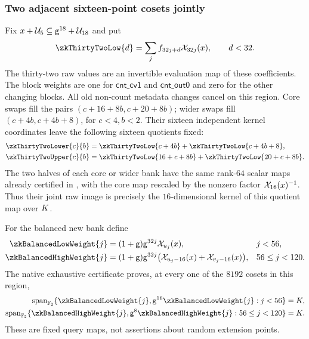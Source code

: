 \subsubsection{Two adjacent sixteen-point cosets jointly}

Fix $x+\mathcal{U}_5\subseteq\mathsf{g}^{18}+\mathcal{U}_{18}$ and put
\[
 \zkThirtyTwoLow{d}=\sum_j f_{32j+d}\novel_{32j}(x),\qquad d<32.
\]
The thirty-two raw values are an invertible evaluation map of these coefficients. The block weights are one for $\mathsf{cnt\_cv1}$ and $\mathsf{cnt\_out0}$ and zero for the other changing blocks. All old non-count metadata changes cancel on this region. Core swaps fill the pairs $(c+16+8b,c+20+8b)$; wider swaps fill $(c+4b,c+4b+8)$, for $c<4,b<2$. Their sixteen independent kernel coordinates leave the following sixteen quotients fixed:
\[
 \begin{aligned}
 \zkThirtyTwoLower{c}{b}&=\zkThirtyTwoLow{c+4b}+\zkThirtyTwoLow{c+4b+8},\\
 \zkThirtyTwoUpper{c}{b}&=\zkThirtyTwoLow{16+c+8b}+\zkThirtyTwoLow{20+c+8b}.
 \end{aligned}
\]
The two halves of each core or wider bank have the same rank-$64$ scalar maps already certified in , with the core map rescaled by the nonzero factor $\mathcal{X}_{16}(x)^{-1}$. Thus their joint raw image is precisely the $16$-dimensional kernel of this quotient map over $K$.

For the balanced new bank define
\[
 \begin{aligned}
 \zkBalancedLowWeight{j}&=(1+\gen)\gen^{32j}\novel_{u_j}(x),&&j<56,\\
 \zkBalancedHighWeight{j}&=(1+\gen)\gen^{32j}
       \bigl(\novel_{u_j-16}(x)+\novel_{v_j-16}(x)\bigr),&&56\le j<120.
 \end{aligned}
\]
The native exhaustive certificate proves, at every one of the $8192$ cosets in this region,
\[
 \begin{aligned}
 \operatorname{span}_{\Ftwo}\{\zkBalancedLowWeight{j},\gen^{16}\zkBalancedLowWeight{j}:j<56\}&=\K,\\
 \operatorname{span}_{\Ftwo}\{\zkBalancedHighWeight{j},\gen^8\zkBalancedHighWeight{j}:56\le j<120\}&=\K.
 \end{aligned}
\]
These are fixed query maps, not assertions about random extension points.

